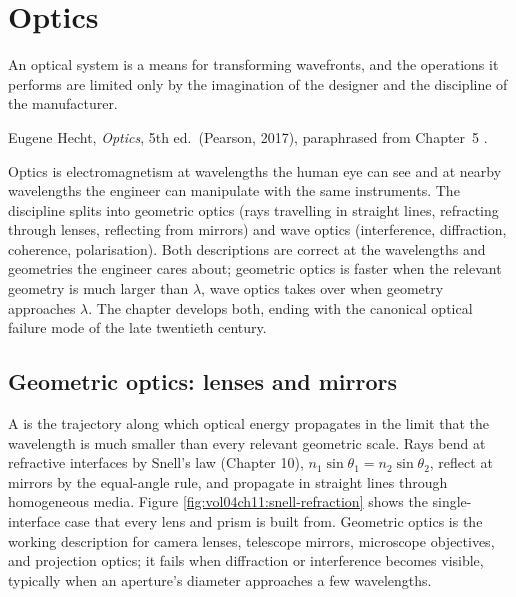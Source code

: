\chapter{Optics}
\label{vol04:ch11}

\epigraph{An optical system is a means for transforming wavefronts,
and the operations it performs are limited only by the imagination
of the designer and the discipline of the manufacturer.}{Eugene
Hecht, \emph{Optics}, 5th ed.\ (Pearson, 2017), paraphrased from
Chapter~5 \cite[Chapter~5]{text:hecht-optics}.}


\noindent
Optics is electromagnetism at wavelengths the human eye can see and at
nearby wavelengths the engineer can manipulate with the same
instruments. The discipline splits into geometric optics (rays
travelling in straight lines, refracting through lenses, reflecting
from mirrors) and wave optics (interference, diffraction, coherence,
polarisation). Both descriptions are correct at the wavelengths and
geometries the engineer cares about; geometric optics is faster when
the relevant geometry is much larger than $\lambda$, wave optics
takes over when geometry approaches $\lambda$. The chapter develops
both, ending with the canonical optical failure mode of the late
twentieth century.

\section{Geometric optics: lenses and mirrors}

A  is the trajectory along which optical energy
propagates in the limit that the wavelength is much smaller than every
relevant geometric scale. Rays bend at refractive interfaces by
Snell's law (Chapter 10), $n_{1}\sin\theta_{1} = n_{2}\sin\theta_{2}$,
reflect at mirrors by the equal-angle rule,
and propagate in straight lines through homogeneous media. Figure
\ref{fig:vol04ch11:snell-refraction} shows the single-interface case
that every lens and prism is built from. Geometric
optics is the working description for camera lenses, telescope
mirrors, microscope objectives, and projection optics; it fails when
diffraction or interference becomes visible, typically when an
aperture's diameter approaches a few wavelengths.

